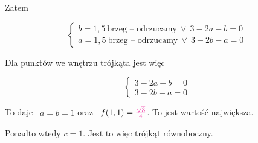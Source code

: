 Zatem 

\[ \begin{cases} b = 1,5 \ \textrm{brzeg -- odrzucamy} \ \lor \ 3 - 2a - b = 0 \\
    a = 1,5 \ \textrm{brzeg -- odrzucamy} \ \lor \ 3 - 2b - a = 0
\end{cases} \]

Dla punktów we wnętrzu trójkąta jest więc

\[ 
\begin{cases}
    3 - 2a - b = 0 \\
    3 - 2b - a = 0
\end{cases}    
\]

To daje \ $ a = b = 1$ oraz \ $ f(1,1) = \textcolor{magenta}{\frac{\sqrt3}{4}} $. To jest wartość największa.

Ponadto wtedy $c = 1$. Jest to więc trójkąt równoboczny.